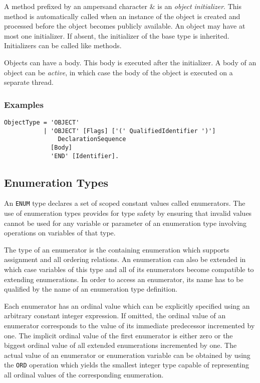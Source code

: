 \documentclass[a4wide,11pt]{article}
\begin{document}
A method prefixed by an ampersand character $\&$ is an \emph{object initializer}.
This method is automatically called when an instance of the object is created and processed before the object becomes publicly available.
An object may have at most one initializer.
If absent, the initializer of the base type is inherited.
Initializers can be called like methods.

Objects can have a body.
This body is executed after the initializer.
A body of an object can be \emph{active}, in which case the body of the object is executed on a separate thread.


\begin{annotation}
\subsubsection{Examples}
\begin{lstlisting}[style=ebnf]
ObjectType = 'OBJECT'
           | 'OBJECT' [Flags] ['(' QualifiedIdentifier ')']
               DeclarationSequence
             [Body]
             'END' [Identifier].
\end{lstlisting}
\end{annotation}

\subsection{Enumeration Types}

An \lstinline"ENUM" type declares a set of scoped constant values called enumerators.
The use of enumeration types provides for type safety by ensuring that invalid values cannot be used for any variable or parameter of an enumeration type involving operations on variables of that type.

The type of an enumerator is the containing enumeration which supports assignment and all ordering relations.
An enumeration can also be extended in which case variables of this type and all of its enumerators become compatible to extending enumerations.
In order to access an enumerator, its name has to be qualified by the name of an enumeration type definition.

Each enumerator has an ordinal value which can be explicitly specified using an arbitrary constant integer expression.
If omitted, the ordinal value of an enumerator corresponds to the value of its immediate predecessor incremented by one.
The implicit ordinal value of the first enumerator is either zero or the biggest ordinal value of all extended enumerations incremented by one.
The actual value of an enumerator or enumeration variable can be obtained by using the \lstinline"ORD" operation which yields the smallest integer type capable of representing all ordinal values of the corresponding enumeration.
\end{document}
